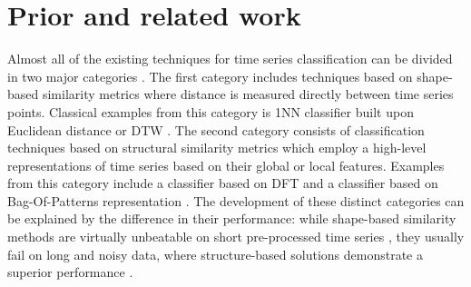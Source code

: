 \documentclass[conference]{IEEEtran}
\begin{document}
\section{Prior and related work} \label{prior}
\vspace{-0.1cm}
Almost all of the existing techniques for time series classification can be divided 
in two major categories \cite{comparison}. 
The first category includes techniques based on shape-based similarity metrics 
where distance is measured directly between time series points. 
Classical examples from this category is 1NN classifier 
built upon Euclidean distance \cite{1NN} or DTW \cite{DTW}. 
The second category consists of classification techniques based on 
structural similarity metrics which employ a high-level representations 
of time series based on their global or local features. 
Examples from this category include a classifier based on 
DFT \cite{DFT} and a classifier based on Bag-Of-Patterns representation 
\cite{bag_patterns}. 
The development of these distinct categories can be explained by 
the difference in their performance: 
while shape-based similarity methods are virtually unbeatable on short 
pre-processed time series \cite{benchmark}, 
they usually fail on long and noisy data, where structure-based solutions 
demonstrate a superior performance \cite{bag_patterns}. 


%
%
\end{document}
